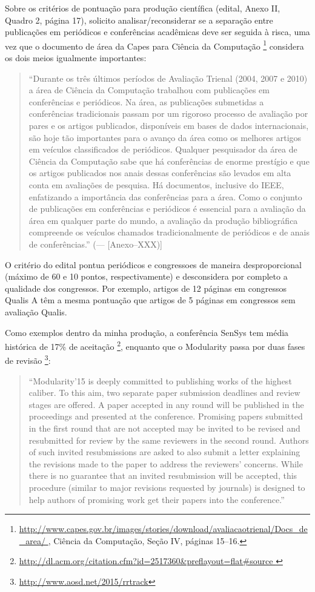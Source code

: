 \documentclass[12pt,a4paper]{article}
\begin{document}
Sobre os critérios de pontuação para produção científica (edital, Anexo II, 
Quadro 2, página 17), solicito analisar/reconsiderar se a separação entre 
publicações em periódicos e conferências acadêmicas deve ser seguida à risca,
uma vez que o documento de área da Capes para Ciência da Computação%
\footnote{\url{
http://www.capes.gov.br/images/stories/download/avaliacaotrienal/Docs_de_area/
},
Ciência da Computação, Seção IV, páginas 15--16.
} considera os dois meios igualmente importantes:
\begin{quote}
``Durante os três últimos períodos de Avaliação Trienal (2004, 2007 e 2010) a 
área de Ciência da Computação trabalhou com publicações em conferências e 
periódicos.
Na área, as publicações submetidas a conferências tradicionais passam por um 
rigoroso processo de avaliação por pares e os artigos publicados, disponíveis 
em bases de dados internacionais, são hoje tão importantes para o avanço da 
área como os melhores artigos em veículos classificados de periódicos.
Qualquer pesquisador da área de Ciência da Computação sabe que há conferências 
de enorme prestígio e que os artigos publicados nos anais dessas conferências 
são levados em alta conta em avaliações de pesquisa.
Há documentos, inclusive do IEEE, enfatizando a importância das conferências 
para a área.
Como o conjunto de publicações em conferências e periódicos é essencial para a 
avaliação da área em qualquer parte do mundo, a avaliação da produção 
bibliográfica compreende os veículos chamados tradicionalmente de periódicos e 
de anais de conferências.''
(--- [Anexo--XXX)]
\end{quote}

O critério do edital pontua periódicos e congressoes de maneira desproporcional 
(máximo de 60 e 10 pontos, respectivamente) e desconsidera por completo a 
qualidade dos congressos.
Por exemplo, artigos de 12 páginas em congressos Qualis A têm a
mesma pontuação que artigos de 5 páginas em congressos sem avaliação Qualis.

Como exemplos dentro da minha produção, a conferência SenSys tem média 
histórica de 17\% de aceitação%
\footnote{\url{
http://dl.acm.org/citation.cfm?id=2517360&preflayout=flat#source
}}, enquanto que o Modularity passa por duas fases de revisão%
\footnote{\url{http://www.aosd.net/2015/rrtrack}}:
\begin{quote}
``Modularity'15 is deeply committed to publishing works of the highest caliber.  
To this aim, two separate paper submission deadlines and review stages are 
offered. A paper accepted in any round will be published in the proceedings and 
presented at the conference. Promising papers submitted in the first round that 
are not accepted may be invited to be revised and resubmitted for review by the 
same reviewers in the second round. Authors of such invited resubmissions are 
asked to also submit a letter explaining the revisions made to the paper to 
address the reviewers' concerns. While there is no guarantee that an invited 
resubmission will be accepted, this procedure (similar to major revisions 
requested by journals) is designed to help authors of promising work get their 
papers into the conference.''
\end{quote}
\end{document}
